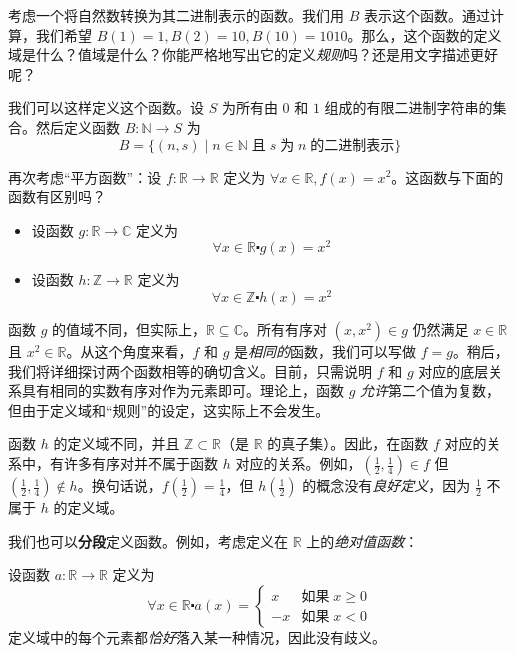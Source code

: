 \begin{example}
    考虑一个将自然数转换为其二进制表示的函数。我们用 $B$ 表示这个函数。通过计算，我们希望 $B(1) = 1, B(2) = 10, B(10) = 1010$。那么，这个函数的定义域是什么？值域是什么？你能严格地写出它的定义\emph{规则}吗？还是用文字描述更好呢？

    我们可以这样定义这个函数。设 $S$ 为所有由 $0$ 和 $1$ 组成的有限二进制字符串的集合。然后定义函数 $B : \mathbb{N} \to S$ 为
    \[B = \{(n, s) \mid n \in \mathbb{N} \;\text{且}\; s \;\text{为}\; n \;\text{的二进制表示}\}\]
\end{example}

\begin{example}
    再次考虑``平方函数''：设 $f : \mathbb{R} \to \mathbb{R}$ 定义为 $\forall x \in \mathbb{R}, f(x) = x^2$。这函数与下面的函数有区别吗？
    \begin{itemize}
        \item 设函数 $g : \mathbb{R} \to \mathbb{C}$ 定义为
            \[\forall x \in \mathbb{R} \centerdot g(x) = x^2\]
        \item 设函数 $h : \mathbb{Z} \to \mathbb{R}$ 定义为
            \[\forall x \in \mathbb{Z} \centerdot h(x) = x^2\]
    \end{itemize}

    函数 $g$ 的值域不同，但实际上，$\mathbb{R} \subseteq \mathbb{C}$。所有有序对 $(x, x^2) \in g$ 仍然满足 $x \in \mathbb{R}$ 且 $x^2 \in \mathbb{R}$。从这个角度来看，$f$ 和 $g$ 是\emph{相同的}函数，我们可以写做 $f = g$。稍后，我们将详细探讨两个函数相等的确切含义。目前，只需说明 $f$ 和 $g$ 对应的底层关系具有相同的实数有序对作为元素即可。理论上，函数 $g$ \emph{允许}第二个值为复数，但由于定义域和``规则''的设定，这实际上不会发生。

    函数 $h$ 的定义域不同，并且 $\mathbb{Z} \subset \mathbb{R}$（是 $\mathbb{R}$ 的真子集）。因此，在函数 $f$ 对应的关系中，有许多有序对并不属于函数 $h$ 对应的关系。例如，$(\frac{1}{2}, \frac{1}{4}) \in f$ 但 $(\frac{1}{2}, \frac{1}{4}) \notin h$。换句话说，$f(\frac{1}{2}) = \frac{1}{4}$，但 $h(\frac{1}{2})$ 的概念没有\emph{良好定义}，因为 $\frac{1}{2}$ 不属于 $h$ 的定义域。
\end{example}

\begin{example}
    我们也可以\textbf{分段}定义函数。例如，考虑定义在 $\mathbb{R}$ 上的\emph{绝对值函数}：

    设函数 $a : \mathbb{R} \to \mathbb{R}$ 定义为
    \[\forall x \in \mathbb{R} \centerdot a(x) = 
    \begin{cases}
         x &\text{如果}\; x \ge 0 \\
        -x &\text{如果}\; x < 0
     \end{cases}\]
     定义域中的每个元素都\emph{恰好}落入某一种情况，因此没有歧义。
\end{example}

